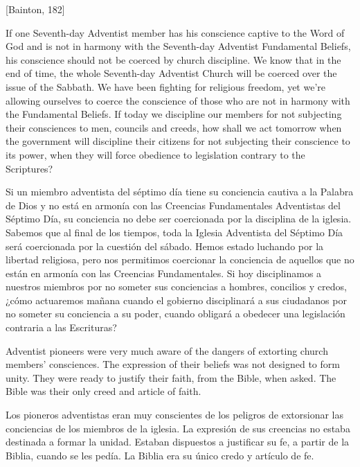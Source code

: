[Bainton, 182]


If one Seventh-day Adventist member has his conscience captive to the Word of God and is not in harmony with the Seventh-day Adventist Fundamental Beliefs, his conscience should not be coerced by church discipline. We know that in the end of time, the whole Seventh-day Adventist Church will be coerced over the issue of the Sabbath. We have been fighting for religious freedom, yet we’re allowing ourselves to coerce the conscience of those who are not in harmony with the Fundamental Beliefs. If today we discipline our members for not subjecting their consciences to men, councils and creeds, how shall we act tomorrow when the government will discipline their citizens for not subjecting their conscience to its power, when they will force obedience to legislation contrary to the Scriptures?


Si un miembro adventista del séptimo día tiene su conciencia cautiva a la Palabra de Dios y no está en armonía con las Creencias Fundamentales Adventistas del Séptimo Día, su conciencia no debe ser coercionada por la disciplina de la iglesia. Sabemos que al final de los tiempos, toda la Iglesia Adventista del Séptimo Día será coercionada por la cuestión del sábado. Hemos estado luchando por la libertad religiosa, pero nos permitimos coercionar la conciencia de aquellos que no están en armonía con las Creencias Fundamentales. Si hoy disciplinamos a nuestros miembros por no someter sus conciencias a hombres, concilios y credos, ¿cómo actuaremos mañana cuando el gobierno disciplinará a sus ciudadanos por no someter su conciencia a su poder, cuando obligará a obedecer una legislación contraria a las Escrituras?


Adventist pioneers were very much aware of the dangers of extorting church members’ consciences. The expression of their beliefs was not designed to form unity. They were ready to justify their faith, from the Bible, when asked. The Bible was their only creed and article of faith.


Los pioneros adventistas eran muy conscientes de los peligros de extorsionar las conciencias de los miembros de la iglesia. La expresión de sus creencias no estaba destinada a formar la unidad. Estaban dispuestos a justificar su fe, a partir de la Biblia, cuando se les pedía. La Biblia era su único credo y artículo de fe.


